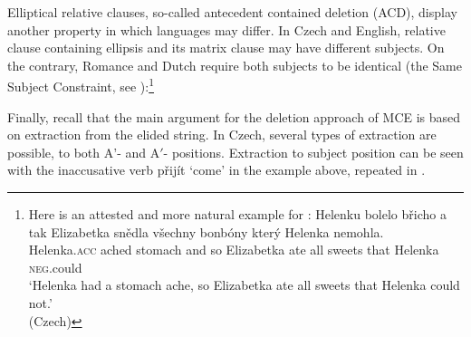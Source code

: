 \documentclass[output=paper,colorlinks,citecolor=brown,
modfonts
]{langscibook}
\begin{document}
\noindent Elliptical relative clauses, so-called antecedent contained deletion (ACD), display another property in which languages may differ. In Czech and English, relative clause containing ellipsis and its matrix clause may have different subjects. On the contrary, Romance and Dutch require both subjects to be identical (the Same Subject Constraint, see ):\footnote{Here is an attested and more natural example for : 
\ea	
\gll Helenku  bolelo břicho a tak  Elizabetka snědla všechny bonbóny který Helenka nemohla.\\
Helenka.\textsc{acc} ached stomach and so Elizabetka ate all sweets that   Helenka \textsc{neg}.could \\
\glt ‘Helenka had a stomach ache, so Elizabetka ate all sweets that Helenka could not.’\\\xspace\hfill (Czech)\z}

\begin{exe}
\ex \label{22}
\begin{xlist}
\end{xlist}
\end{exe}
	
\noindent Finally, recall that the main argument for the deletion approach of MCE is based on extraction from the elided string. In Czech, several types of extraction are possible, to both A$’$- and A$'$- positions. Extraction to subject position can be seen with the inaccusative verb přijít `come' in the example  above, repeated in . 
\end{document}
